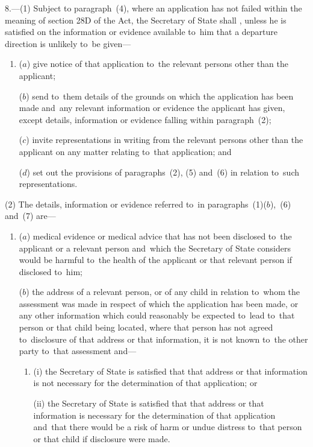 \documentclass[12pt,a4paper]{article}
\begin{document}
8.—(1) Subject to
paragraph~(4), where an application has not failed within the meaning of section
28D of the Act, the Secretary of State shall%
, unless he is satisfied on the information or evidence available to~him that a departure direction is unlikely to~be given—  %
\begin{enumerate}\item[]
($a$) give notice of that application to~the relevant persons other than the
applicant;

($b$) send to~them details of the grounds on which the application has been made
and~any relevant information or evidence the applicant has given, except
details, information or evidence falling within paragraph~(2);

($c$) invite representations in writing from the relevant persons other than the
applicant on any matter relating to~that application; and

($d$) set out the provisions of paragraphs~(2), (5) and~(6) in relation to~such
representations.
\end{enumerate}

(2) The details, information or evidence referred to~in paragraphs~(1)($b$),~(6)
and~(7) are—
\begin{enumerate}\item[]
($a$) medical evidence or medical advice that has not been disclosed to~the
applicant or a relevant person and~which the Secretary of State considers would
be harmful to~the health of the applicant or that relevant person if disclosed
to~him;

($b$) the address of a relevant person, or of any child in relation to~whom the
assessment was made in respect of which the application has been made, or any
other information which could reasonably be expected to~lead to~that person or
that child being located, where that person has not agreed to~disclosure of that
address or that information, it is not known to~the other party to~that
assessment and—
\begin{enumerate}\item[]
(i) the Secretary of State is satisfied that that address or that information is
not necessary for the determination of that application; or

(ii) the Secretary of State is satisfied that that address or that information is
necessary for the determination of that application and~that there would be a
risk of harm or undue distress to~that person or that child if disclosure were
made.
\end{enumerate}
\end{enumerate}
\end{document}
